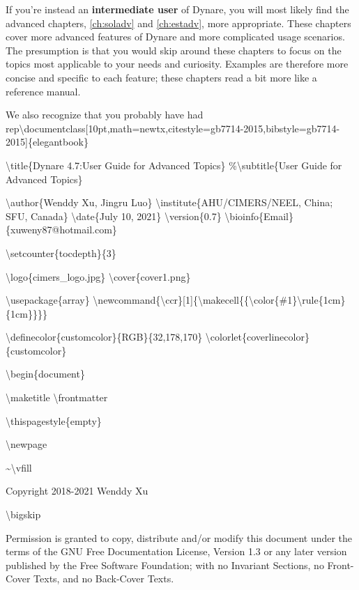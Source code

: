 \documentclass[10pt,math=newtx,citestyle=gb7714-2015,bibstyle=gb7714-2015]{elegantbook}
\begin{document}
	If you're instead an \textbf{intermediate user} of Dynare, you will most likely find the advanced chapters, \ref{ch:soladv} and \ref{ch:estadv}, more appropriate. These chapters cover more advanced features of Dynare and more complicated usage scenarios. The presumption is that you would skip around these chapters to focus on the topics most applicable to your needs and curiosity. Examples are therefore more concise and specific to each feature; these chapters read a bit more like a reference manual.
	
	We also recognize that you probably have had rep\textbackslash{}documentclass[10pt,math=newtx,citestyle=gb7714-2015,bibstyle=gb7714-2015]\{elegantbook\}
	
	\textbackslash{}title\{Dynare 4.7:User Guide for Advanced Topics\}
	\%\textbackslash{}subtitle\{User Guide for Advanced Topics\}
	
	\textbackslash{}author\{Wenddy Xu, Jingru Luo\}
	\textbackslash{}institute\{AHU/CIMERS/NEEL, China; SFU, Canada\}
	\textbackslash{}date\{July 10, 2021\}
	\textbackslash{}version\{0.7\}
	\textbackslash{}bioinfo\{Email\}\{xuweny87@hotmail.com\}
	
	
	\textbackslash{}setcounter\{tocdepth\}\{3\}
	
	\textbackslash{}logo\{cimers\_logo.jpg\}
	\textbackslash{}cover\{cover1.png\}
	
	\textbackslash{}usepackage\{array\}
	\textbackslash{}newcommand\{\textbackslash{}ccr\}[1]\{\textbackslash{}makecell\{\{\textbackslash{}color\{\#1\}\textbackslash{}rule\{1cm\}\{1cm\}\}\}\}
	
	\textbackslash{}definecolor\{customcolor\}\{RGB\}\{32,178,170\}
	\textbackslash{}colorlet\{coverlinecolor\}\{customcolor\}
	
	\textbackslash{}begin\{document\}
	
	\textbackslash{}maketitle
	\textbackslash{}frontmatter
	
	\textbackslash{}thispagestyle\{empty\}
	
	\textbackslash{}newpage
	
	\~{}\textbackslash{}vfill
	
	Copyright  2018-2021 Wenddy Xu
	
	
	\textbackslash{}bigskip
	
	Permission is granted to copy, distribute and/or modify this document under the terms of the GNU Free Documentation License, Version 1.3 or any later version published by the Free Software Foundation; with no Invariant Sections, no Front-Cover Texts, and no Back-Cover Texts.
	
\end{document}
